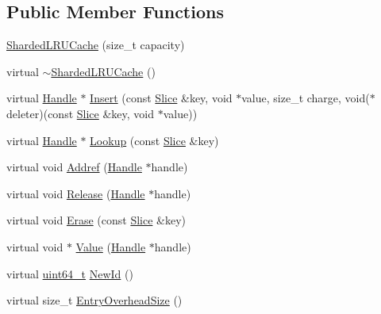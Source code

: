 \subsection*{Public Member Functions}
\begin{DoxyCompactItemize}
\item 
\hyperlink{classleveldb_1_1anonymous__namespace_02cache_8cc_03_1_1_sharded_l_r_u_cache_a1779b7d8dee1445e56ffbb2b31266196}{Sharded\+L\+R\+U\+Cache} (size\+\_\+t capacity)
\item 
virtual \hyperlink{classleveldb_1_1anonymous__namespace_02cache_8cc_03_1_1_sharded_l_r_u_cache_a599b7927ff2fd861e2450ad4f2dacf8b}{$\sim$\+Sharded\+L\+R\+U\+Cache} ()
\item 
virtual \hyperlink{structleveldb_1_1_cache_1_1_handle}{Handle} $\ast$ \hyperlink{classleveldb_1_1anonymous__namespace_02cache_8cc_03_1_1_sharded_l_r_u_cache_ac41fbfba6e82426c93908e2031f68097}{Insert} (const \hyperlink{classleveldb_1_1_slice}{Slice} \&key, void $\ast$value, size\+\_\+t charge, void($\ast$deleter)(const \hyperlink{classleveldb_1_1_slice}{Slice} \&key, void $\ast$value))
\item 
virtual \hyperlink{structleveldb_1_1_cache_1_1_handle}{Handle} $\ast$ \hyperlink{classleveldb_1_1anonymous__namespace_02cache_8cc_03_1_1_sharded_l_r_u_cache_abab2ff6b6b42ad513af055909686b011}{Lookup} (const \hyperlink{classleveldb_1_1_slice}{Slice} \&key)
\item 
virtual void \hyperlink{classleveldb_1_1anonymous__namespace_02cache_8cc_03_1_1_sharded_l_r_u_cache_adfffb61ec759e9831bd100aabc550633}{Addref} (\hyperlink{structleveldb_1_1_cache_1_1_handle}{Handle} $\ast$handle)
\item 
virtual void \hyperlink{classleveldb_1_1anonymous__namespace_02cache_8cc_03_1_1_sharded_l_r_u_cache_ae2e03dafff555826052ca9f295e0145f}{Release} (\hyperlink{structleveldb_1_1_cache_1_1_handle}{Handle} $\ast$handle)
\item 
virtual void \hyperlink{classleveldb_1_1anonymous__namespace_02cache_8cc_03_1_1_sharded_l_r_u_cache_a3f7444b1d90be31d626806f98ac327cd}{Erase} (const \hyperlink{classleveldb_1_1_slice}{Slice} \&key)
\item 
virtual void $\ast$ \hyperlink{classleveldb_1_1anonymous__namespace_02cache_8cc_03_1_1_sharded_l_r_u_cache_a122f1b28b575c5c908ff0603f1e1a0f6}{Value} (\hyperlink{structleveldb_1_1_cache_1_1_handle}{Handle} $\ast$handle)
\item 
virtual \hyperlink{stdint_8h_aaa5d1cd013383c889537491c3cfd9aad}{uint64\+\_\+t} \hyperlink{classleveldb_1_1anonymous__namespace_02cache_8cc_03_1_1_sharded_l_r_u_cache_acd073ddb23863d59eed6017668447661}{New\+Id} ()
\item 
virtual size\+\_\+t \hyperlink{classleveldb_1_1anonymous__namespace_02cache_8cc_03_1_1_sharded_l_r_u_cache_a08a8d95b841f8e05af64a353dd216a2e}{Entry\+Overhead\+Size} ()
\end{DoxyCompactItemize}
